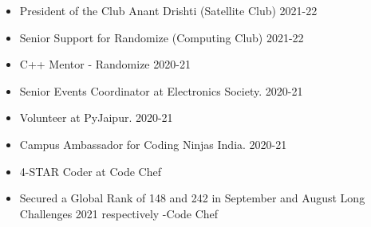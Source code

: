\documentclass[10pt,a4paper,ragged2e]{altacv}
\begin{document}

\begin{itemize}
    \item President of the Club Anant Drishti (Satellite Club) 2021-22
    \item Senior Support for Randomize (Computing Club) 2021-22
    \item C++ Mentor - Randomize 2020-21
     \item Senior Events Coordinator at Electronics Society. 2020-21
    \item Volunteer at PyJaipur. 2020-21
    \item Campus Ambassador for Coding Ninjas India. 2020-21
   
\end{itemize}



\begin{itemize}
    \item 4-STAR Coder at Code Chef
    \item Secured a Global Rank of 148 and 242 in September and August Long Challenges 2021 respectively -Code Chef

   
    
    
\end{itemize}










































\end{document}
